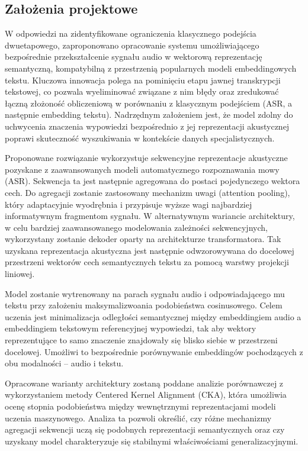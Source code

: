 \subsection{Założenia projektowe}
W odpowiedzi na zidentyfikowane ograniczenia klasycznego podejścia dwuetapowego, zaproponowano opracowanie systemu umożliwiającego bezpośrednie przekształcenie sygnału audio w wektorową reprezentację semantyczną, kompatybilną z przestrzenią popularnych modeli embeddingowych tekstu. Kluczowa innowacja polega na pominięciu etapu jawnej transkrypcji tekstowej, co pozwala wyeliminować związane z nim błędy oraz zredukować łączną złożoność obliczeniową w porównaniu z klasycznym podejściem (ASR, a następnie embedding tekstu). Nadrzędnym założeniem jest, że model zdolny do uchwycenia znaczenia wypowiedzi bezpośrednio z jej reprezentacji akustycznej poprawi skuteczność wyszukiwania w kontekście danych specjalistycznych.

Proponowane rozwiązanie wykorzystuje sekwencyjne reprezentacje akustyczne pozyskane z zaawansowanych modeli automatycznego rozpoznawania mowy (ASR). Sekwencja ta jest następnie agregowana do postaci pojedynczego wektora cech. Do agregacji zostanie zastosowany mechanizm uwagi (attention pooling), który adaptacyjnie wyodrębnia i przypisuje wyższe wagi najbardziej informatywnym fragmentom sygnału. W alternatywnym wariancie architektury, w celu bardziej zaawansowanego modelowania zależności sekwencyjnych, wykorzystany zostanie dekoder oparty na architekturze transformatora. Tak uzyskana reprezentacja akustyczna jest następnie odwzorowywana do docelowej przestrzeni wektorów cech semantycznych tekstu za pomocą warstwy projekcji liniowej.

Model zostanie wytrenowany na parach sygnału audio i odpowiadającego mu tekstu przy założeniu maksymalizwoania podobieństwa cosinusowego. Celem uczenia jest minimalizacja odległości semantycznej między embeddingiem audio a embeddingiem tekstowym referencyjnej wypowiedzi, tak aby wektory reprezentujące to samo znaczenie znajdowały się blisko siebie w przestrzeni docelowej. Umożliwi to bezpośrednie porównywanie embeddingów pochodzących z obu modalności – audio i tekstu.

Opracowane warianty architektury zostaną poddane analizie porównawczej z wykorzystaniem metody Centered Kernel Alignment (CKA)\cite{pmlr-v97-kornblith19a}, która umożliwia ocenę stopnia podobieństwa między wewnętrznymi reprezentacjami modeli uczenia maszynowego. Analiza ta pozwoli określić, czy różne mechanizmy agregacji sekwencji uczą się podobnych reprezentacji semantycznych oraz czy uzyskany model charakteryzuje się stabilnymi właściwościami generalizacyjnymi.

